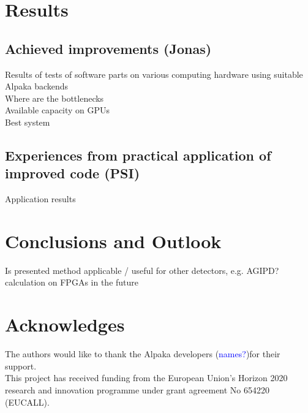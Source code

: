 \documentclass[a4paper]{article}
\begin{document}
\section{Results}
\label{sec:results}
\subsection{Achieved improvements (Jonas)}
Results of tests of software parts on various computing hardware using suitable Alpaka backends\\

Where are the bottlenecks\\

Available capacity on GPUs\\

Best system

\subsection{Experiences from practical application of improved code (PSI)}
Application results

\section{Conclusions and Outlook}
\label{sec:conclusions}
Is presented method applicable / useful for other detectors, e.g. AGIPD? \\

calculation on FPGAs in the future


\section{Acknowledges}
The authors would like to thank  the Alpaka developers (\textcolor{blue}{names?})for their support.\\

This project has received funding from the European Union's Horizon 2020 research and innovation programme under grant agreement No 654220 (EUCALL).

\newpage

\begin{sloppypar}
\printbibliography
\end{sloppypar}
\end{document}
